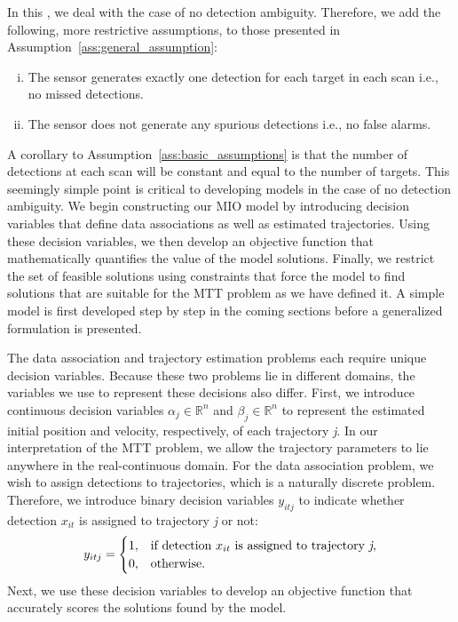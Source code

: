 In this \mytitle, we deal with the case of no detection ambiguity. Therefore, we add the following, more restrictive assumptions, to those presented in Assumption~\ref{ass:general_assumption}:

\begin{assumption}\label{ass:basic_assumptions}
\leavevmode
\begin{enumerate}[(i)]
\item The sensor generates exactly one detection for each target in each scan i.e., no missed detections.
\item The sensor does not generate any spurious detections
i.e., no false alarms.
\end{enumerate}
\end{assumption}
A corollary to Assumption~\ref{ass:basic_assumptions} is that the number of detections at each scan will be constant and equal to the number of targets. This seemingly simple point is critical to developing models in the case of no detection ambiguity. We begin constructing our MIO model by introducing decision variables that define data associations as well as estimated trajectories. Using these decision variables, we then develop an objective function that mathematically quantifies the value of the model solutions. Finally, we restrict the set of feasible solutions using constraints that force the model to find solutions that are suitable for the MTT problem as we have defined it. A simple model is first developed step by step in the coming sections before a generalized formulation is presented. 

The data association and trajectory estimation problems each require unique decision variables. Because these two problems lie in different domains, the variables we use to represent these decisions also differ. First, we introduce continuous decision variables $\alpha_{j} \in \mathbb{R}^n$ and $\beta_{j} \in \mathbb{R}^n$ to represent the estimated initial position and velocity, respectively, of each trajectory \textit{j}. In our interpretation of the MTT problem, we allow the trajectory parameters to lie anywhere in the real-continuous domain. For the data association problem, we wish to assign detections to trajectories, which is a naturally discrete problem. Therefore, we introduce binary decision variables $y_{itj}$ to indicate whether detection $x_{it}$ is assigned to trajectory \textit{j} or not:
\begin{align}
y_{itj} =
\begin{cases}
1, & \text{if detection $x_{it}$ is assigned to trajectory \textit{j},} \\
0, & \text{otherwise.}
\end{cases}
\end{align}
Next, we use these decision variables to develop an objective function that accurately scores the solutions found by the model. 

